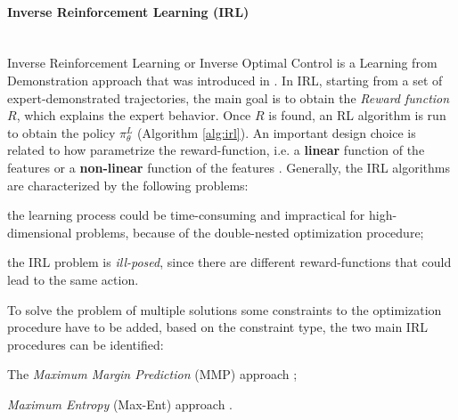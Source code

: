\paragraph{Inverse Reinforcement Learning (IRL)}  \mbox{} \\
Inverse Reinforcement Learning or Inverse Optimal Control is a Learning from Demonstration approach that was introduced in \cite{abbeel2004apprenticeship}. In IRL, starting from a set of expert-demonstrated trajectories, the main goal is to obtain the \textit{Reward function} $R$, which explains the expert behavior. Once $R$ is found, an RL algorithm is run to obtain the policy $\pi^{L}_{\theta}$ (Algorithm \ref{alg:irl}). %
An important design choice is related to how parametrize the reward-function, i.e. a \textbf{linear} function of the features \cite{ratliff2006maximum_margin,ziebart2008maximum_entropy} or  a \textbf{non-linear} function of the features \cite{ratliff2009learning_to_search,wulfmeier2015deep_inverse_rl,finn2016guided_cost_learning}.
Generally, the IRL algorithms are characterized by the following problems: \begin{enumerate*}[label=\textbf{(\arabic*)}]
    \item the learning process could be time-consuming and impractical for high-dimensional problems, because of the double-nested optimization procedure;
    \item the IRL problem is \textit{ill-posed}, since there are different reward-functions that could lead to the same action.
\end{enumerate*}
%
\newline To solve the problem of multiple solutions some constraints to the optimization procedure have to be added, based on the constraint type, the two main IRL procedures can be identified: \begin{enumerate*}[label=\textbf{(\alph*)}]
    \item The \textit{Maximum Margin Prediction} (MMP) approach \cite{ratliff2006maximum_margin,ratliff2009learning_to_search};
    \item \textit{Maximum Entropy} (Max-Ent) approach \cite{ziebart2008maximum_entropy,wulfmeier2015deep_inverse_rl,finn2016guided_cost_learning}.
\end{enumerate*}
